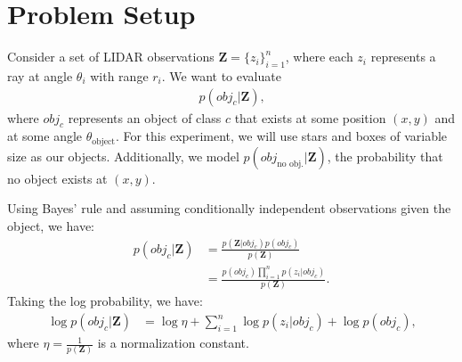 \section{Problem Setup}

Consider a set of LIDAR observations $\mathbf{Z} = \{ z_i \}_{i=1}^n$, where
each $z_i$ represents a ray at angle $\theta_i$ with range $r_i$. We
want to evaluate
%
\begin{align}
  p( obj_c | \mathbf{Z} )
  \text{,}
\end{align}
%
where $obj_c$ represents an object of class $c$ that exists at some position $(x,
y)$ and at some angle $\theta_{\text{object}}$. For this experiment, we will use
stars and boxes of variable size as our objects. Additionally, we model $p(
obj_{\text{no obj.}} | \mathbf{Z})$, the probability that no object exists at $(x,
y)$.

Using Bayes' rule and assuming conditionally independent observations given the
object, we have:
%
\begin{align}
  p( obj_c | \mathbf{Z} ) &= \frac{p(\mathbf{Z} | obj_c) p(obj_c)}{p(\mathbf{Z})} \\
    &= \frac{p(obj_c) \prod_{i=1}^{n} { p( z_i | obj_c) }} {p(\mathbf{Z})}
    \label{eq:cond_ind}
  \text{.}
\end{align}
%
Taking the log probability, we have:
%
\begin{align}
  \log p( obj_c | \mathbf{Z} ) &= \log{\eta} + \sum_{i=1}^{n} { \log p( z_i |
    obj_c) } + \log p ( obj_c )
  \text{,}
  \label{eq:obj_model}
\end{align}
%
where $\eta = \frac{1}{p(\mathbf{Z})}$ is a normalization constant.
